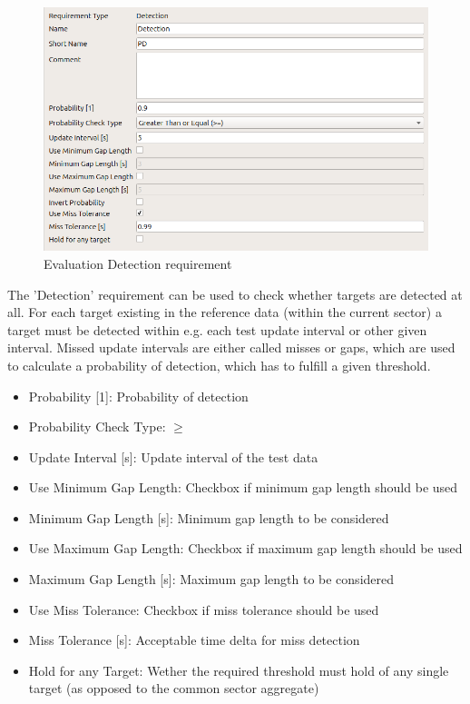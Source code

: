 \begin{figure}[H]
    \includegraphics[width=14cm,frame]{figures/eval_req_detection.png}
  \caption{Evaluation Detection requirement}
\end{figure}

The 'Detection' requirement can be used to check whether targets are detected at all. For each target existing in the reference data (within the current sector) a target must be detected within e.g. each test update interval or other given interval. Missed update intervals are either called misses or gaps, which are used to calculate a probability of detection, which has to fulfill a given threshold. \\

\begin{itemize}  
\item Probability [1]: Probability of detection
\item Probability Check Type: $\geq$
\item Update Interval [s]: Update interval of the test data
\item Use Minimum Gap Length: Checkbox if minimum gap length should be used
\item Minimum Gap Length [s]: Minimum gap length to be considered
\item Use Maximum Gap Length: Checkbox if maximum gap length should be used
\item Maximum Gap Length [s]: Maximum gap length to be considered
\item Use Miss Tolerance: Checkbox if miss tolerance should be used
\item Miss Tolerance [s]: Acceptable time delta for miss detection
\item Hold for any Target: Wether the required threshold must hold of any single target (as opposed to the common sector aggregate)
\end{itemize}
\ \\

